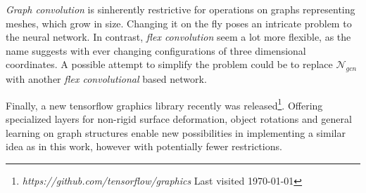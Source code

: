   \emph{Graph convolution} is sinherently restrictive for operations on graphs representing meshes, which grow in size. Changing it on the fly poses an
  intricate problem to the neural network. In contrast, \emph{flex convolution} seem a lot more flexible, as the name suggests with ever changing configurations 
  of three dimensional coordinates. A possible attempt to simplify the problem could be to replace $\mathcal{N}_{gcn}$ with another \emph{flex convolutional} 
  based network. 

  Finally, a new tensorflow graphics library recently was released\footnote{\emph{https://github.com/tensorflow/graphics} Last visited \today}. Offering specialized layers for non-rigid surface deformation,
   object rotations and general learning on graph structures enable new possibilities in implementing a similar idea as in this work,
    however with potentially fewer restrictions.
